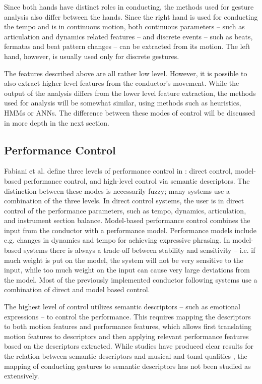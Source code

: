 Since both hands have distinct roles in conducting,
the methods used for gesture analysis also differ between the hands.
Since the right hand is used for conducting the tempo
and is in continuous motion,
both continuous parameters --
such as articulation and dynamics related features --
and discrete events --
such as beats, fermatas and beat pattern changes --
can be extracted from its motion.
The left hand, however,
is usually used only for discrete gestures.

The features described above are all rather low level.
However, it is possible to also extract
higher level features from the conductor's movement.
While the output of the analysis differs from
the lower level feature extraction,
the methods used for analysis will be somewhat similar,
using methods such as heuristics, HMMs or ANNs.
The difference between these modes of control
will be discussed in more depth in the next section.

\subsection{Performance Control}

Fabiani et al. define three levels of performance control in \cite{Fabiani2012}:
direct control, model-based performance control,
and high-level control via semantic descriptors.
The distinction between these modes is necessarily fuzzy;
many systems use a combination of the three levels.
In direct control systems,
the user is in direct control of the performance parameters,
such as tempo, dynamics, articulation, and instrument section balance.
Model-based performance control combines the input from the conductor
with a performance model.
Performance models include
e.g. changes in dynamics and tempo
for achieving expressive phrasing.
In model-based systems
there is always a trade-off between stability and sensitivity --
i.e. if much weight is put on the model,
the system will not be very sensitive to the input,
while too much weight on the input
can cause very large deviations from the model.
Most of the previously implemented conductor following systems
use a combination of direct and model based control.

The highest level of control utilizes semantic descriptors --
such as emotional expressions --
to control the performance.
This requires mapping the descriptors to both motion features
and performance features,
which allows first translating motion features to
descriptors and then applying relevant performance features
based on the descriptors extracted.
While studies have produced clear results for
the relation between semantic descriptors
and musical and tonal qualities \cite{moravec2005, juslin2000cue},
the mapping of conducting gestures to semantic descriptors
has not been studied as extensively.

